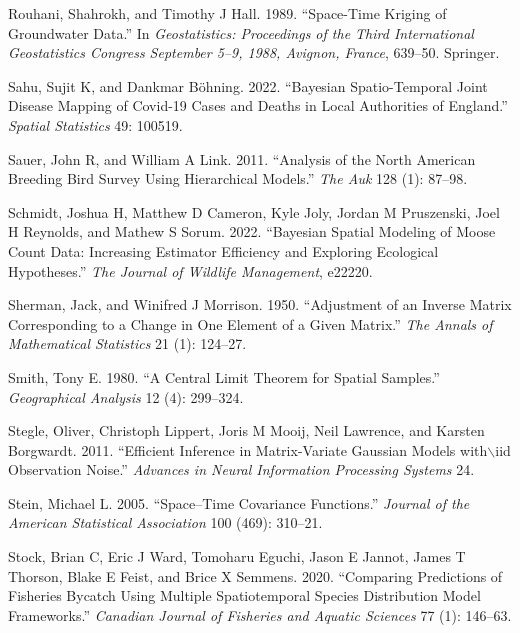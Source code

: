 \documentclass[]{article}    %
\newlength{\cslhangindent}
\newlength{\cslentryspacingunit} %
\newenvironment{CSLReferences}[2] %
 {%
  \setlength{\parindent}{0pt}
  \ifodd #1
  \let\oldpar\par
  \def\par{\hangindent=\cslhangindent\oldpar}
  \fi
  \setlength{\parskip}{#2\cslentryspacingunit}
 }%
 {}
\begin{document}
\begin{CSLReferences}{1}{0}
\leavevmode{}%
Rouhani, Shahrokh, and Timothy J Hall. 1989. {``Space-Time Kriging of
Groundwater Data.''} In \emph{Geostatistics: Proceedings of the Third
International Geostatistics Congress September 5--9, 1988, Avignon,
France}, 639--50. Springer.

\leavevmode{}%
Sahu, Sujit K, and Dankmar Böhning. 2022. {``Bayesian Spatio-Temporal
Joint Disease Mapping of Covid-19 Cases and Deaths in Local Authorities
of England.''} \emph{Spatial Statistics} 49: 100519.

\leavevmode{}%
Sauer, John R, and William A Link. 2011. {``Analysis of the North
American Breeding Bird Survey Using Hierarchical Models.''} \emph{The
Auk} 128 (1): 87--98.

\leavevmode{}%
Schmidt, Joshua H, Matthew D Cameron, Kyle Joly, Jordan M Pruszenski,
Joel H Reynolds, and Mathew S Sorum. 2022. {``Bayesian Spatial Modeling
of Moose Count Data: Increasing Estimator Efficiency and Exploring
Ecological Hypotheses.''} \emph{The Journal of Wildlife Management},
e22220.

\leavevmode{}%
Sherman, Jack, and Winifred J Morrison. 1950. {``Adjustment of an
Inverse Matrix Corresponding to a Change in One Element of a Given
Matrix.''} \emph{The Annals of Mathematical Statistics} 21 (1): 124--27.

\leavevmode{}%
Smith, Tony E. 1980. {``A Central Limit Theorem for Spatial Samples.''}
\emph{Geographical Analysis} 12 (4): 299--324.

\leavevmode{}%
Stegle, Oliver, Christoph Lippert, Joris M Mooij, Neil Lawrence, and
Karsten Borgwardt. 2011. {``Efficient Inference in Matrix-Variate
Gaussian Models with\(\backslash\)iid Observation Noise.''}
\emph{Advances in Neural Information Processing Systems} 24.

\leavevmode{}%
Stein, Michael L. 2005. {``Space--Time Covariance Functions.''}
\emph{Journal of the American Statistical Association} 100 (469):
310--21.

\leavevmode{}%
Stock, Brian C, Eric J Ward, Tomoharu Eguchi, Jason E Jannot, James T
Thorson, Blake E Feist, and Brice X Semmens. 2020. {``Comparing
Predictions of Fisheries Bycatch Using Multiple Spatiotemporal Species
Distribution Model Frameworks.''} \emph{Canadian Journal of Fisheries
and Aquatic Sciences} 77 (1): 146--63.


\end{CSLReferences}
\end{document}
